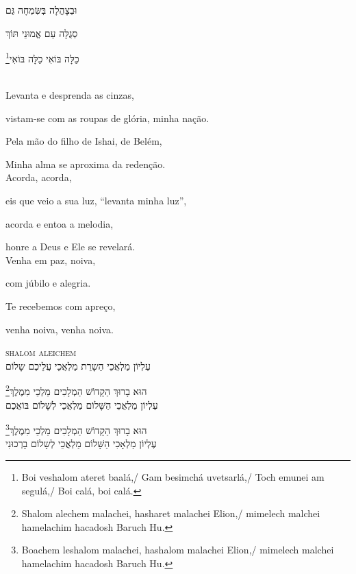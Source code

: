 וּבְצָהֳלָה בְּשִּׂמְחָה גַּם 

סְגֻלָּה עַם אֱמוּנֵי תּוֹךְ 

\footnote{
Boi veshalom ateret baalá,/ Gam besimchá uvetsarlá,/
Toch emunei am segulá,/ Boi calá, boi calá.}כַלָּה בּוֹאִי כַלָּה בּוֹאִי

\movetooddpage
\raggedright

\vspace*{1cm}

\textsc{}\\[15pt]


Levanta e desprenda as cinzas,

vistam-se com as roupas de glória, minha nação.

Pela mão do filho de Ishai, de Belém,

Minha alma se aproxima da redenção.\\[10pt]

Acorda, acorda,

eis que veio a sua luz, ``levanta minha luz'',

acorda e entoa a melodia,

honre a Deus e Ele se revelará.\\[10pt]

Venha em paz, noiva,

com júbilo e alegria.

Te recebemos com apreço,

venha noiva, venha noiva.

\movetoevenpage
\raggedleft
{}

\vspace*{1cm}

\textsc{shalom aleichem}\\[15pt]

עֶלְיוֹן מַלְאֲכֵי הַשָרֵת מַלְאֲכֵי עֲלֵיכֶם שָלוֹם

\footnote{Shalom alechem malachei, hasharet malachei Elion,/
mimelech malchei hamelachim hacadosh Baruch Hu.}הוּא בָרוּךְ הַקָדוֹשׁ הַמְלָכִים מַלְכֵי מִמֶלֶךְ\\[10pt]

עֶלְיוֹן מַלְאֲכֵי הַשָּׁלוֹם מַלְאֲכֵי לְשָׁלוֹם בּוֹאֲכֶם

\footnote{Boachem leshalom malachei, hashalom malachei Elion,/
mimelech malchei hamelachim hacadosh Baruch Hu.}הוּא בָרוּךְ הַקָדוֹשׁ הַמְלָכִים מַלְכֵי מִמֶלֶךְ\\[10pt]

עֶלְיוֹן מַלְאָכִי הַשָּׁלוֹם מַלְאֲכֵי לְשָלוֹם בָרְכוּנִי

